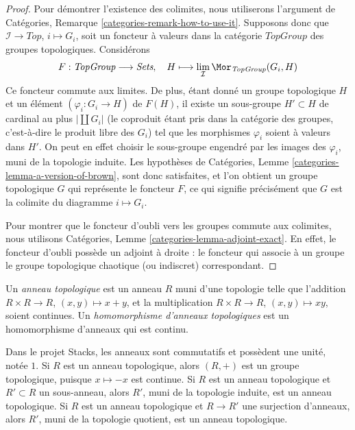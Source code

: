 \begin{proof}
Pour démontrer l'existence des colimites, nous utiliserons l'argument de
Catégories, Remarque \ref{categories-remark-how-to-use-it}. Supposons donc que
$\mathcal{I} \to \textit{Top}$, $i \mapsto G_i$, soit un foncteur à valeurs
dans la catégorie $\textit{TopGroup}$ des groupes topologiques. Considérons
$$
F : \textit{TopGroup} \longrightarrow \textit{Sets},\quad
H \longmapsto \lim_\mathcal{I} \Mor_{\textit{TopGroup}}(G_i, H)
$$
Ce foncteur commute aux limites. De plus, étant donné un groupe topologique
$H$ et un élément $(\varphi_i : G_i \to H)$ de $F(H)$, il existe un
sous-groupe $H' \subset H$ de cardinal au plus $|\coprod G_i|$ (le coproduit
étant pris dans la catégorie des groupes, c'est-à-dire le produit libre des
$G_i$) tel que les morphismes $\varphi_i$ soient à valeurs dans $H'$. On peut
en effet choisir le sous-groupe engendré par les images des $\varphi_i$, muni
de la topologie induite. Les hypothèses de Catégories, Lemme
\ref{categories-lemma-a-version-of-brown}, sont donc satisfaites, et l'on
obtient un groupe topologique $G$ qui représente le foncteur $F$, ce qui
signifie précisément que $G$ est la colimite du diagramme $i \mapsto G_i$.

\medskip\noindent
Pour montrer que le foncteur d'oubli vers les groupes commute aux colimites,
nous utilisons Catégories, Lemme \ref{categories-lemma-adjoint-exact}. En
effet, le foncteur d'oubli possède un adjoint à droite : le foncteur qui associe
à un groupe le groupe topologique chaotique (ou indiscret) correspondant.
\end{proof}

\begin{definition}
\label{definition-topological-ring}
Un {\it anneau topologique} est un anneau $R$ muni d'une topologie telle que
l'addition $R \times R \to R$, $(x, y) \mapsto x + y$, et la multiplication
$R \times R \to R$, $(x, y) \mapsto xy$, soient continues.
Un {\it homomorphisme d'anneaux topologiques} est un homomorphisme d'anneaux
qui est continu.
\end{definition}

\noindent
Dans le projet Stacks, les anneaux sont commutatifs et possèdent une unité,
notée $1$. Si $R$ est un anneau topologique, alors $(R, +)$ est un groupe
topologique, puisque
$x \mapsto -x$ est continue. Si $R$ est un anneau topologique et
$R' \subset R$ un sous-anneau, alors $R'$, muni de la topologie induite, est
un anneau topologique. Si $R$ est un anneau topologique et $R \to R'$ une
surjection d'anneaux, alors $R'$, muni de la topologie quotient, est un anneau
topologique.

